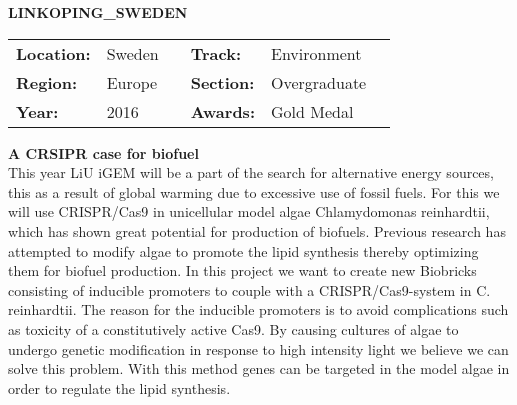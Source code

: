 \noindent\textbf{\uppercase{Linkoping\_Sweden}} 
\FloatBarrier
\begin{table}[h]
\begin{tabular}{lp{2.5cm}llll}
\textbf{Location:} & Sweden & \multicolumn{1}{|l}{} & \textbf{Track:}   & Environment \\
\textbf{Region:}   & Europe   & \multicolumn{1}{|l}{} & \textbf{Section:} & Overgraduate \\
\textbf{Year:}     & 2016   & \multicolumn{1}{|l}{} & \textbf{Awards:}  & Gold Medal
\end{tabular}
\end{table} 
\FloatBarrier
\noindent\textbf{A CRSIPR case for biofuel} \vspace{.2cm}\\
This year LiU iGEM will be a part of the search for alternative energy sources, this as a result of global warming due to excessive use of fossil fuels. For this we will use CRISPR/Cas9 in unicellular model algae Chlamydomonas reinhardtii, which has shown great potential for production of biofuels. Previous research has attempted to modify algae to promote the lipid synthesis thereby optimizing them for biofuel production. In this project we want to create new Biobricks consisting of inducible promoters to couple with a CRISPR/Cas9-system in C. reinhardtii. The reason for the inducible promoters is to avoid complications such as toxicity of a constitutively active Cas9. By causing cultures of algae to undergo genetic modification in response to high intensity light we believe we can solve this problem. With this method genes can be targeted in the model algae in order to regulate the lipid synthesis. \\ \\
\vspace{2cm}  $ $
\pagebreak

